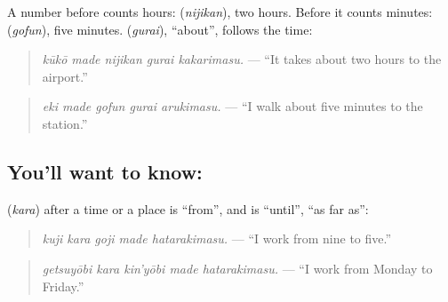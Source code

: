 A number before \textbf{} counts hours: \textbf{} (\emph{nijikan}), two hours. Before \textbf{} it counts minutes: \textbf{} (\emph{gofun}), five minutes. \textbf{} (\emph{gurai}), \textquotedblleft{}about\textquotedblright{}, follows the time:

\begin{quote}
\textbf{  }
\end{quote}

\begin{quote}
\emph{kūkō made nijikan gurai kakarimasu.} — \textquotedblleft{}It takes about two hours to the airport.\textquotedblright{}
\end{quote}

\begin{quote}
\textbf{  }
\end{quote}

\begin{quote}
\emph{eki made gofun gurai arukimasu.} — \textquotedblleft{}I walk about five minutes to the station.\textquotedblright{}
\end{quote}

\subsection*{You'll want to know:  }
\textbf{} (\emph{kara}) after a time or a place is \textquotedblleft{}from\textquotedblright{}, and \textbf{} is \textquotedblleft{}until\textquotedblright{}, \textquotedblleft{}as far as\textquotedblright{}:

\begin{quote}
\textbf{  }
\end{quote}

\begin{quote}
\emph{kuji kara goji made hatarakimasu.} — \textquotedblleft{}I work from nine to five.\textquotedblright{}
\end{quote}

\begin{quote}
\textbf{  }
\end{quote}

\begin{quote}
\emph{getsuyōbi kara kin'yōbi made hatarakimasu.} — \textquotedblleft{}I work from Monday to Friday.\textquotedblright{}
\end{quote}


